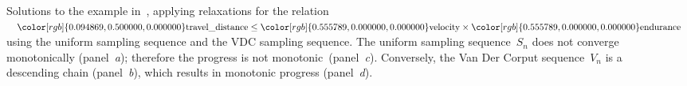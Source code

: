 \documentclass[twocolumn,english]{IEEEconf}
\theoremstyle{plain}
\theoremstyle{definition}
\theoremstyle{definition}
\theoremstyle{plain}
\newcommand{\colR}{\color[rgb]{0.555789,0.000000,0.000000}}
\newcommand{\colF}{\color[rgb]{0.094869,0.500000,0.000000}}
\begin{document}
\begin{center}
\begin{figure}[t]
\begin{centering}
{\begin{centering}
\par\end{centering}
}
\par\end{centering}
\caption{Solutions to the example in~, applying relaxations
for the relation ${\colF\text{travel\_distance}}\leq{\colR\text{velocity}}\times{\colR\text{endurance}}$
using the uniform sampling sequence and the VDC sampling sequence.
The uniform sampling sequence~$S_{n}$ does not converge monotonically
(panel~\emph{a}); therefore the progress is not monotonic~(panel\emph{~c}).
Conversely, the Van Der Corput sequence~$V_{n}$ is a descending
chain (panel~\emph{b}), which results in monotonic progress (panel~\emph{d}).}
\end{figure}
\par\end{center}
\end{document}
